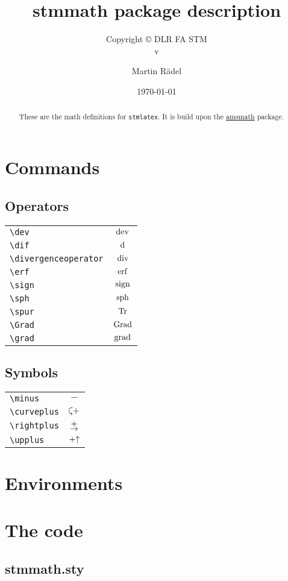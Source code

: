 \documentclass{scrartcl}
\author{Martin R\"{a}del}
\title{stmmath package description}
\subtitle{Copyright \copyright{} \the\year{} DLR FA STM\\v\DTMsetdatestyle{versiondate}\DTMtoday}
\date{\today}
\begin{document}
\maketitle

\begin{abstract}
These are the math definitions for \texttt{stmlatex}. It is build upon the \href{https://ctan.org/pkg/amsmath}{amsmath} package.
\end{abstract}

\tableofcontents

\section{Commands}

\subsection{Operators}

\begin{tabularx}{\linewidth}{Xc}
\verb+\dev+ & $\operatorname{dev}$\\
\verb+\dif+ & $\mathop{}\!\mathrm{d}$\\
\verb+\divergenceoperator+ & $\operatorname{div}$\\
\verb+\erf+ & $\operatorname{erf}$\\
\verb+\sign+ & $\operatorname{sign}$\\
\verb+\sph+ & $\operatorname{sph}$\\
\verb+\spur+ & $\operatorname{Tr}$\\
\verb+\Grad+ & $\operatorname{Grad}$\\
\verb+\grad+ & $\operatorname{grad}$
\end{tabularx}

\subsection{Symbols}

\begin{tabularx}{\linewidth}{Xc}
\verb+\minus+ & $\minus$\\
\verb+\curveplus+ & $\curveplus$\\
\verb+\rightplus+ & $\rightplus$\\
\verb+\upplus+ & $\mathbin{+\mathord\uparrow}$
\end{tabularx}

\section{Environments}

\newpage

\appendix

\newpage
\section{The code}

\subsection{stmmath.sty}


\end{document}
